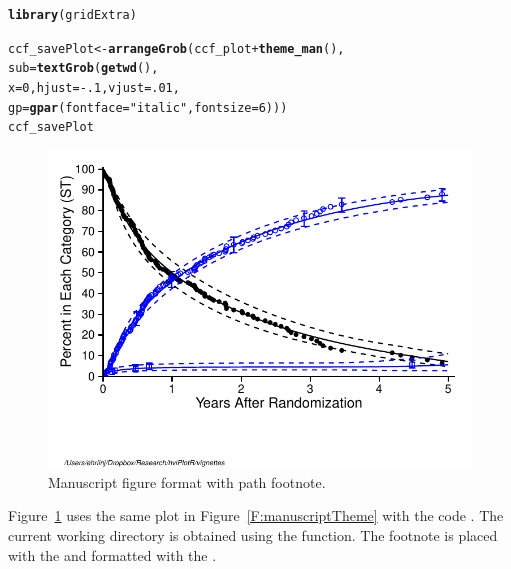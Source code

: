\documentclass[nojss]{jss}\usepackage[]{graphicx}\usepackage[]{color}
\makeatletter
\def\maxwidth{ %
  \ifdim\Gin@nat@width>\linewidth
    \linewidth
  \else
    \Gin@nat@width
  \fi
}
\newcommand{\hlnum}[1]{\textcolor[rgb]{0.686,0.059,0.569}{#1}}%
\newcommand{\hlstr}[1]{\textcolor[rgb]{0.192,0.494,0.8}{#1}}%
\newcommand{\hlopt}[1]{\textcolor[rgb]{0,0,0}{#1}}%
\newcommand{\hlstd}[1]{\textcolor[rgb]{0.345,0.345,0.345}{#1}}%
\newcommand{\hlkwb}[1]{\textcolor[rgb]{0.69,0.353,0.396}{#1}}%
\newcommand{\hlkwc}[1]{\textcolor[rgb]{0.333,0.667,0.333}{#1}}%
\newcommand{\hlkwd}[1]{\textcolor[rgb]{0.737,0.353,0.396}{\textbf{#1}}}%
\newenvironment{kframe}{%
 \def\at@end@of@kframe{}%
 \ifinner\ifhmode%
  \def\at@end@of@kframe{\end{minipage}}%
  \begin{minipage}{\columnwidth}%
 \fi\fi%
 \def\FrameCommand##1{\hskip\@totalleftmargin \hskip-\fboxsep
 \colorbox{shadecolor}{##1}\hskip-\fboxsep
     \hskip-\linewidth \hskip-\@totalleftmargin \hskip\columnwidth}%
 \MakeFramed {\advance\hsize-\width
   \@totalleftmargin\z@ \linewidth\hsize
   \@setminipage}}%
 {\par\unskip\endMakeFramed%
 \at@end@of@kframe}
\newenvironment{knitrout}{}{} %
\makeatother
\begin{document}
\begin{knitrout}\footnotesize
{}\color{fgcolor}\begin{kframe}
\begin{alltt}
\hlkwd{library}\hlstd{(gridExtra)}

\hlstd{ccf_savePlot} \hlkwb{<-} \hlkwd{arrangeGrob}\hlstd{(ccf_plot}\hlopt{+}\hlkwd{theme_man}\hlstd{(),}
                            \hlkwc{sub} \hlstd{=} \hlkwd{textGrob}\hlstd{(}\hlkwd{getwd}\hlstd{(),}
                                           \hlkwc{x} \hlstd{=} \hlnum{0}\hlstd{,} \hlkwc{hjust} \hlstd{=} \hlopt{-}\hlnum{.1}\hlstd{,} \hlkwc{vjust}\hlstd{=}\hlnum{.01}\hlstd{,}
                                           \hlkwc{gp} \hlstd{=} \hlkwd{gpar}\hlstd{(}\hlkwc{fontface} \hlstd{=} \hlstr{"italic"}\hlstd{,} \hlkwc{fontsize} \hlstd{=} \hlnum{6}\hlstd{)))}
\hlstd{ccf_savePlot}
\end{alltt}
\end{kframe}\begin{figure}[htpb]


{\centering \includegraphics[width=\maxwidth]{figure/beamer-manuscriptFootnote} 

}

\caption[Manuscript figure format with path footnote]{Manuscript figure format with path footnote.\label{F:manuscriptFootnote}}
\end{figure}


\end{knitrout}
Figure~\ref{F:manuscriptFootnote} uses the same plot in Figure~\ref{F:manuscriptTheme} with the code . The current working directory is obtained using the  function. The footnote is placed with the  and formatted with the .
\end{document}
